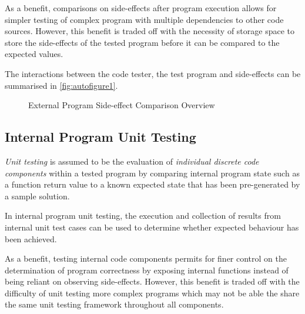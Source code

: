 \documentclass[hidelinks, 12pt]{extreport}
\begin{document}
As a benefit, comparisons on side-effects after program execution allows for simpler testing of complex program with multiple dependencies to other code sources. However, this benefit is traded off with the necessity of storage space to store the side-effects of the tested program before it can be compared to the expected values.

The interactions between the code tester, the test program and side-effects can be summarised in \autoref{fig:autofigure1}.

\begin{figure}[h]
	\centering
	\caption{External Program Side-effect Comparison Overview}
	\label{fig:autofigure1}
\end{figure}


\subsection{Internal Program Unit Testing}

\textit{Unit testing} is assumed to be the evaluation of \textit{individual discrete code components} within a tested program by comparing internal program state such as a function return value to a known expected state that has been pre-generated by a sample solution.

In internal program unit testing, the execution and collection of results from internal unit test cases can be used to determine whether expected behaviour has been achieved.

As a benefit, testing internal code components permits for finer control on the determination of program correctness by exposing internal functions instead of being reliant on observing side-effects. However, this benefit is traded off with the difficulty of unit testing more complex programs which may not be able the share the same unit testing framework throughout all components.
\end{document}
